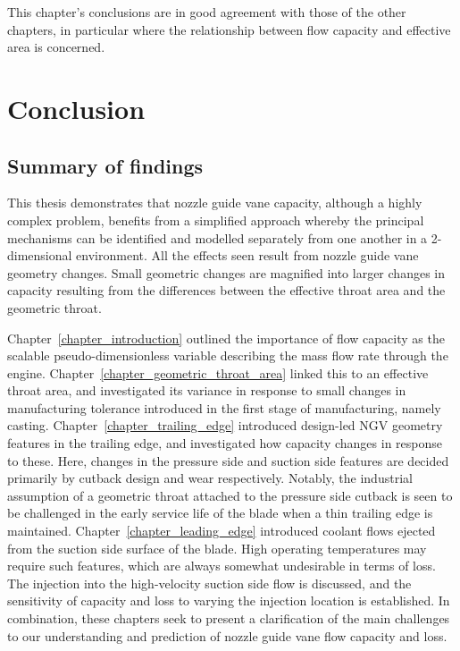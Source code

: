 \documentclass[a4paper, 11pt, oneside]{report}
\begin{document}
This chapter's conclusions are in good agreement with those of the other chapters, in particular where the relationship between flow capacity and effective area is concerned. 



\chapter{Conclusion}


\section{Summary of findings}

This thesis demonstrates that nozzle guide vane capacity, although a highly complex problem, benefits from a simplified approach whereby the principal mechanisms can be identified and modelled separately from one another in a 2-dimensional environment. All the effects seen result from nozzle guide vane geometry changes. Small geometric changes are magnified into larger changes in capacity resulting from the differences between the effective throat area and the geometric throat.

Chapter~\ref{chapter_introduction} outlined the importance of flow capacity as the scalable pseudo-dimensionless variable describing the mass flow rate through the engine. Chapter~\ref{chapter_geometric_throat_area} linked this to an effective throat area, and investigated its variance in response to small changes in manufacturing tolerance introduced in the first stage of manufacturing, namely casting. Chapter~\ref{chapter_trailing_edge} introduced design-led NGV geometry features in the trailing edge, and investigated how capacity changes in response to these. Here, changes in the pressure side and suction side features are decided primarily by cutback design and wear respectively. Notably, the industrial assumption of a geometric throat attached to the pressure side cutback is seen to be challenged in the early service life of the blade when a thin trailing edge is maintained.  Chapter~\ref{chapter_leading_edge} introduced coolant flows ejected from the suction side surface of the blade.  High operating temperatures may require such features, which are always somewhat undesirable in terms of loss. The injection into the high-velocity suction side flow is discussed, and the sensitivity of capacity and loss to varying the injection location is established. In combination, these chapters seek to present a clarification of the main challenges to our understanding and prediction of nozzle guide vane flow capacity and loss.
\end{document}
